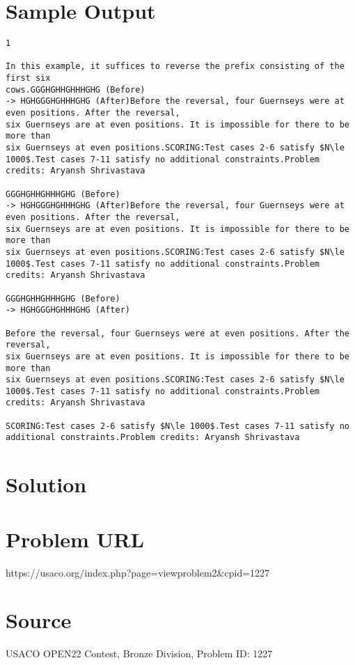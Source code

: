 \documentclass[12pt]{article}
\begin{document}
\section*{Sample Output}
\begin{verbatim}
1

In this example, it suffices to reverse the prefix consisting of the first six
cows.GGGHGHHGHHHGHG (Before)
-> HGHGGGHGHHHGHG (After)Before the reversal, four Guernseys were at even positions. After the reversal,
six Guernseys are at even positions. It is impossible for there to be more than
six Guernseys at even positions.SCORING:Test cases 2-6 satisfy $N\le 1000$.Test cases 7-11 satisfy no additional constraints.Problem credits: Aryansh Shrivastava

GGGHGHHGHHHGHG (Before)
-> HGHGGGHGHHHGHG (After)Before the reversal, four Guernseys were at even positions. After the reversal,
six Guernseys are at even positions. It is impossible for there to be more than
six Guernseys at even positions.SCORING:Test cases 2-6 satisfy $N\le 1000$.Test cases 7-11 satisfy no additional constraints.Problem credits: Aryansh Shrivastava

GGGHGHHGHHHGHG (Before)
-> HGHGGGHGHHHGHG (After)

Before the reversal, four Guernseys were at even positions. After the reversal,
six Guernseys are at even positions. It is impossible for there to be more than
six Guernseys at even positions.SCORING:Test cases 2-6 satisfy $N\le 1000$.Test cases 7-11 satisfy no additional constraints.Problem credits: Aryansh Shrivastava

SCORING:Test cases 2-6 satisfy $N\le 1000$.Test cases 7-11 satisfy no additional constraints.Problem credits: Aryansh Shrivastava
\end{verbatim}

\section*{Solution}


\section*{Problem URL}
https://usaco.org/index.php?page=viewproblem2&cpid=1227

\section*{Source}
USACO OPEN22 Contest, Bronze Division, Problem ID: 1227
\end{document}
